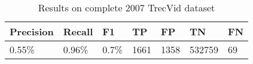 













\begin{table}[ht]
	\centering
	\begin{tabular}{l|l|l||l|l|l|l}
	Precision & Recall & F1 & TP & FP & TN & FN \\ \hline
	0.55\% & 0.96\% & 0.7\% & 1661 & 1358 & 532759 & 69 \\
	\end{tabular}

	\caption{Results on complete 2007 TrecVid dataset}
	\label{tab:hard_cut_results}
\end{table}

